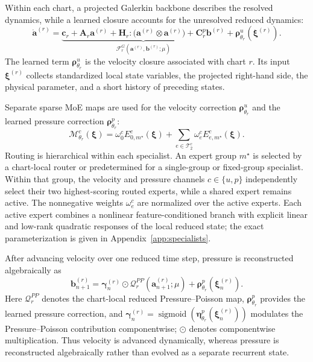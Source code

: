 Within each chart, a projected Galerkin backbone describes the resolved dynamics, while a learned closure accounts for the unresolved reduced dynamics:
\begin{equation}
  \dot{\bm a}^{(r)}=
  \underbrace{\bm c_r+\bm A_r\bm a^{(r)}+
  \bm H_r:\bigl(\bm a^{(r)}\otimes\bm a^{(r)}\bigr)+
  \bm C^p_r\bm b^{(r)}}_{\mathcal F_r^{G}(\bm a^{(r)},\bm b^{(r)};\mu)}
  +\bm\rho^u_{\theta_r}(\bm\xi^{(r)}).
  \label{eq:main_specialist}
\end{equation}
The learned term $\bm\rho^u_{\theta_r}$ is the velocity closure associated with chart $r$. Its input $\bm\xi^{(r)}$ collects standardized local state variables, the projected right-hand side, the physical parameter, and a short history of preceding states.

Separate sparse MoE maps are used for the velocity correction $\bm\rho^u_{\theta_r}$ and the learned pressure correction $\bm\rho^p_{\theta_r}$:
\begin{equation}
  \mathcal M^c_{\theta_r}(\bm\xi)=
  \omega^c_0 E^c_{0,m^\star}(\bm\xi)+
  \sum_{e\in\mathcal T_2^c}\omega^c_e E^c_{e,m^\star}(\bm\xi).
  \label{eq:main_inner_moe}
\end{equation}
Routing is hierarchical within each specialist. An expert group $m^\star$ is selected by a chart-local router or predetermined for a single-group or fixed-group specialist. Within that group, the velocity and pressure channels $c\in\{u,p\}$ independently select their two highest-scoring routed experts, while a shared expert remains active. The nonnegative weights $\omega_e^c$ are normalized over the active experts. Each active expert combines a nonlinear feature-conditioned branch with explicit linear and low-rank quadratic responses of the local reduced state; the exact parameterization is given in Appendix~\ref{app:specialists}.

After advancing velocity over one reduced time step, pressure is reconstructed algebraically as
\begin{equation}
  \bm b_{n+1}^{(r)}
  =\bm\gamma_n^{(r)}\odot\mathcal Q_r^{PP}(\bm a_{n+1}^{(r)};\mu)
  +\bm\rho^p_{\theta_r}(\bm\xi_n^{(r)}).
  \label{eq:main_pressure_closure}
\end{equation}
Here $\mathcal Q_r^{PP}$ denotes the chart-local reduced Pressure--Poisson map, $\bm\rho^p_{\theta_r}$ provides the learned pressure correction, and $\bm\gamma_n^{(r)} =\operatorname{sigmoid}(\bm\eta^p_{\theta_r}(\bm\xi_n^{(r)}))$ modulates the Pressure--Poisson contribution componentwise; $\odot$ denotes componentwise multiplication. Thus velocity is advanced dynamically, whereas pressure is reconstructed algebraically rather than evolved as a separate recurrent state.


